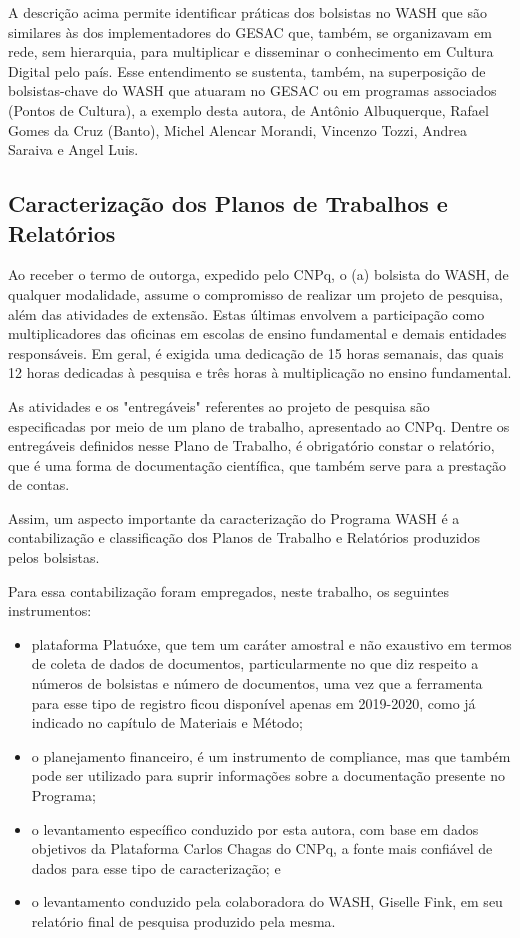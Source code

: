 A descrição acima permite identificar práticas dos bolsistas no WASH que são similares às dos implementadores do GESAC que, também, se organizavam em rede, sem hierarquia, para multiplicar e disseminar o conhecimento em Cultura Digital pelo país. Esse entendimento se sustenta, também, na superposição de bolsistas-chave do WASH que atuaram no GESAC ou em programas associados (Pontos de Cultura), a exemplo desta autora, de Antônio Albuquerque, Rafael Gomes da Cruz (Banto), Michel Alencar Morandi, Vincenzo Tozzi, Andrea Saraiva e Angel Luis.

\subsection[Caracterização dos Planos de Trabalhos e Relatórios]{Caracterização dos Planos de Trabalhos e Relatórios}\label{Caracterização dos Planos de Trabalhos e Relatórios}
Ao receber o termo de outorga, expedido pelo CNPq, o (a) bolsista do WASH, de qualquer modalidade, assume o compromisso de realizar um projeto de pesquisa, além das atividades de extensão. Estas últimas envolvem a participação como multiplicadores das oficinas em escolas de ensino fundamental e demais entidades responsáveis. Em geral, é exigida uma dedicação de 15 horas semanais, das quais 12 horas dedicadas à pesquisa e três horas à multiplicação no ensino fundamental.

As atividades e os "entregáveis" referentes ao projeto de pesquisa são especificadas por meio de um plano de trabalho, apresentado ao CNPq. Dentre os entregáveis definidos nesse Plano de Trabalho, é obrigatório constar o relatório, que é uma forma de documentação científica, que também serve para a prestação de contas.

Assim, um aspecto importante da caracterização do Programa WASH é a contabilização e classificação dos Planos de Trabalho e Relatórios produzidos pelos bolsistas.

Para essa contabilização foram empregados, neste trabalho, os seguintes instrumentos:


\begin{itemize}
\item plataforma Platuóxe, que tem um caráter amostral e não exaustivo em termos de coleta de dados de documentos, particularmente no que diz respeito a números de bolsistas e número de documentos, uma vez que a ferramenta para esse tipo de registro ficou disponível apenas em 2019-2020, como já indicado no capítulo de Materiais e Método;
\item o planejamento financeiro, é um instrumento de compliance, mas que também pode ser utilizado para suprir informações sobre a documentação presente no Programa;
\item o levantamento específico conduzido por esta autora, com base em dados objetivos da Plataforma Carlos Chagas do CNPq, a fonte mais confiável de dados para esse tipo de caracterização; e
\item o levantamento conduzido pela colaboradora do WASH, Giselle Fink, em seu relatório final de pesquisa produzido pela mesma.
\end{itemize}


